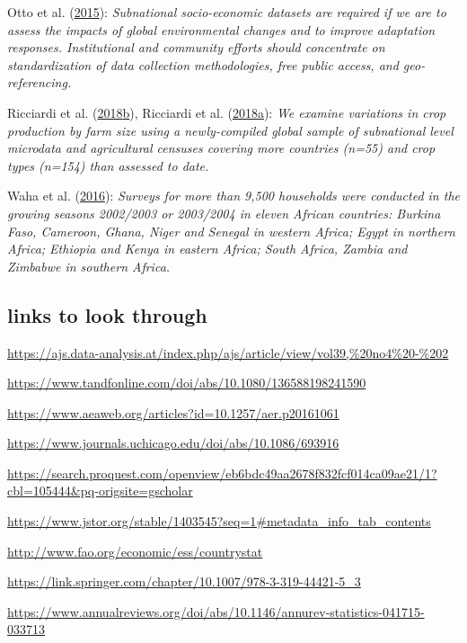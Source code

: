 \documentclass[12pt,]{article}
\begin{document}
Otto et al. (\protect\hyperlink{ref-Otto2015}{2015}): \emph{Subnational socio-economic datasets are required if we are to assess the impacts of global environmental changes and to improve adaptation responses. Institutional and community efforts should concentrate on standardization of data collection methodologies, free public access, and geo-referencing.}

Ricciardi et al. (\protect\hyperlink{ref-Ricciardi2018}{2018}\protect\hyperlink{ref-Ricciardi2018}{b}), Ricciardi et al. (\protect\hyperlink{ref-Ricciardi2018a}{2018}\protect\hyperlink{ref-Ricciardi2018a}{a}): \emph{We examine variations in crop production by farm size using a newly-compiled global sample of subnational level microdata and agricultural censuses covering more countries (n=55) and crop types (n=154) than assessed to date.}

Waha et al. (\protect\hyperlink{ref-Waha2016}{2016}): \emph{Surveys for more than 9,500 households were conducted in the growing seasons 2002/2003 or 2003/2004 in eleven African countries: Burkina Faso, Cameroon, Ghana, Niger and Senegal in western Africa; Egypt in northern Africa; Ethiopia and Kenya in eastern Africa; South Africa, Zambia and Zimbabwe in southern Africa.}

\hypertarget{links-to-look-through}{%
\subsection{links to look through}\label{links-to-look-through}}

\url{https://ajs.data-analysis.at/index.php/ajs/article/view/vol39,\%20no4\%20-\%202}

\url{https://www.tandfonline.com/doi/abs/10.1080/136588198241590}

\url{https://www.aeaweb.org/articles?id=10.1257/aer.p20161061}

\url{https://www.journals.uchicago.edu/doi/abs/10.1086/693916}

\url{https://search.proquest.com/openview/eb6bdc49aa2678f832fcf014ca09ae21/1?cbl=105444\&pq-origsite=gscholar}

\url{https://www.jstor.org/stable/1403545?seq=1\#metadata_info_tab_contents}

\url{http://www.fao.org/economic/ess/countrystat}

\url{https://link.springer.com/chapter/10.1007/978-3-319-44421-5_3}

\url{https://www.annualreviews.org/doi/abs/10.1146/annurev-statistics-041715-033713}
\end{document}
